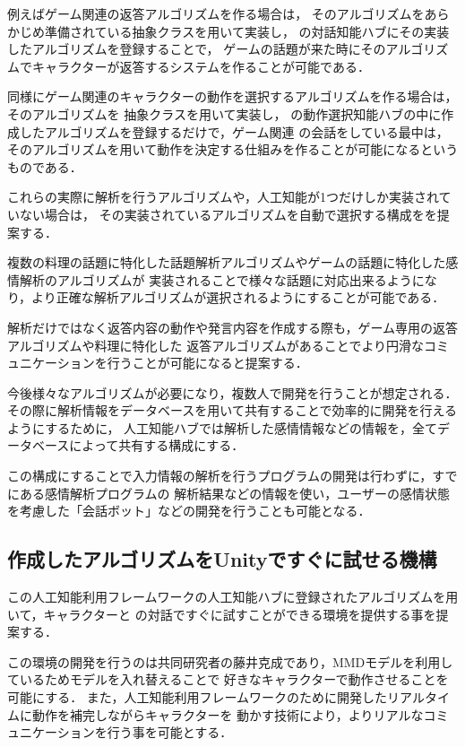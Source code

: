 例えばゲーム関連の返答アルゴリズムを作る場合は，
そのアルゴリズムをあらかじめ準備されている抽象クラスを用いて実装し，
の対話知能ハブにその実装したアルゴリズムを登録することで，
ゲームの話題が来た時にそのアルゴリズムでキャラクターが返答するシステムを作ることが可能である．

同様にゲーム関連のキャラクターの動作を選択するアルゴリズムを作る場合は，そのアルゴリズムを
抽象クラスを用いて実装し，
の動作選択知能ハブの中に作成したアルゴリズムを登録するだけで，ゲーム関連
の会話をしている最中は，そのアルゴリズムを用いて動作を決定する仕組みを作ることが可能になるというものである．

これらの実際に解析を行うアルゴリズムや，人工知能が1つだけしか実装されていない場合は，
その実装されているアルゴリズムを自動で選択する構成をを提案する．

複数の料理の話題に特化した話題解析アルゴリズムやゲームの話題に特化した感情解析のアルゴリズムが
実装されることで様々な話題に対応出来るようになり，より正確な解析アルゴリズムが選択されるようにすることが可能である．

解析だけではなく返答内容の動作や発言内容を作成する際も，ゲーム専用の返答アルゴリズムや料理に特化した
返答アルゴリズムがあることでより円滑なコミュニケーションを行うことが可能になると提案する．

今後様々なアルゴリズムが必要になり，複数人で開発を行うことが想定される．
その際に解析情報をデータベースを用いて共有することで効率的に開発を行えるようにするために，
人工知能ハブでは解析した感情情報などの情報を，全てデータベースによって共有する構成にする．

この構成にすることで入力情報の解析を行うプログラムの開発は行わずに，すでにある感情解析プログラムの
解析結果などの情報を使い，ユーザーの感情状態を考慮した「会話ボット」などの開発を行うことも可能となる．
\subsection{作成したアルゴリズムをUnityですぐに試せる機構}
この人工知能利用フレームワークの人工知能ハブに登録されたアルゴリズムを用いて，キャラクターと
の対話ですぐに試すことができる環境を提供する事を提案する．

この環境の開発を行うのは共同研究者の藤井克成であり，MMDモデルを利用しているためモデルを入れ替えることで
好きなキャラクターで動作させることを可能にする．
また，人工知能利用フレームワークのために開発したリアルタイムに動作を補完しながらキャラクターを
動かす技術により，よりリアルなコミュニケーションを行う事を可能とする．

